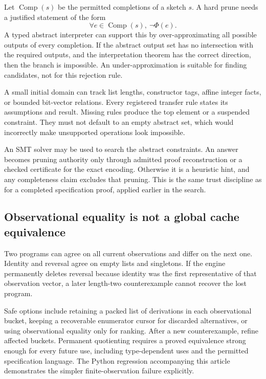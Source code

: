 \documentclass[11pt,letterpaper]{article}
\newcommand{\id}[1]{\texttt{\detokenize{#1}}}
\newcommand{\Spec}{\Phi}
\theoremstyle{definition}
\theoremstyle{remark}
\begin{document}
Let $\operatorname{Comp}(s)$ be the permitted completions of a sketch $s$. A hard prune needs a justified statement of the form
\begin{equation}
 \forall e\in\operatorname{Comp}(s),\ \neg\Spec(e).
 \label{eq:prune}
\end{equation}
A typed abstract interpreter can support this by over-approximating all possible outputs of every completion. If the abstract output set has no intersection with the required outputs, and the interpretation theorem has the correct direction, then the branch is impossible. An under-approximation is suitable for finding candidates, not for this rejection rule.

A small initial domain can track list lengths, constructor tags, affine integer facts, or bounded bit-vector relations. Every registered transfer rule states its assumptions and result. Missing rules produce the top element or a suspended constraint. They must not default to an empty abstract set, which would incorrectly make unsupported operations look impossible.

An SMT solver may be used to search the abstract constraints. An \id{unsat} answer becomes pruning authority only through admitted proof reconstruction or a checked certificate for the exact encoding. Otherwise it is a heuristic hint, and any completeness claim excludes that pruning. This is the same trust discipline as for a completed specification proof, applied earlier in the search.

\subsection{Observational equality is not a global cache equivalence}

Two programs can agree on all current observations and differ on the next one. Identity and reversal agree on empty lists and singletons. If the engine permanently deletes reversal because identity was the first representative of that observation vector, a later length-two counterexample cannot recover the lost program.

Safe options include retaining a packed list of derivations in each observational bucket, keeping a recoverable enumerator cursor for discarded alternatives, or using observational equality only for ranking. After a new counterexample, refine affected buckets. Permanent quotienting requires a proved equivalence strong enough for every future use, including type-dependent uses and the permitted specification language. The Python regression accompanying this article demonstrates the simpler finite-observation failure explicitly.
\end{document}
